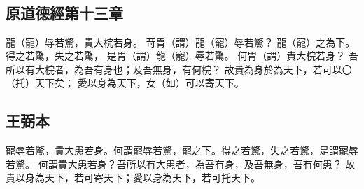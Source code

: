 ﻿%
%

\chapter{~}

\section{原道德經第十三章}

\begin{withgezhu}

\zhsong


龍（\textcolor{tongjia-color}{寵}）辱若驚，貴大梡若身。
苛胃（\textcolor{tongjia-color}{謂}）龍（\textcolor{tongjia-color}{寵}）辱若驚？
龍（\textcolor{tongjia-color}{寵}）之為下。
得之若驚，失\colorbox{adding-color}{之}若驚，
是胃（\textcolor{tongjia-color}{謂}）龍（\textcolor{tongjia-color}{寵}）辱若驚。
何胃（\textcolor{tongjia-color}{謂}）貴大梡若身？
吾所以有大梡者，為吾有身也；及吾無身，有何梡？
故貴為身於為天下，若可以〇（\textcolor{tongjia-color}{托}）天下\colorbox{missing-color}{矣}；
愛以身為天下，女（\textcolor{tongjia-color}{如}）可以寄天下。

\end{withgezhu}

\section{王弼本}

\begin{withgezhu}

\zhsong

寵辱若驚，貴大患若身。何謂寵辱若驚，寵之下。得之若驚，失之若驚，是謂寵辱若驚。
何謂貴大患若身？吾所以有大患者，為吾有身，及吾無身，吾有何患？
故貴以身為天下，若可寄天下；愛以身為天下，若可托天下。

\end{withgezhu}
